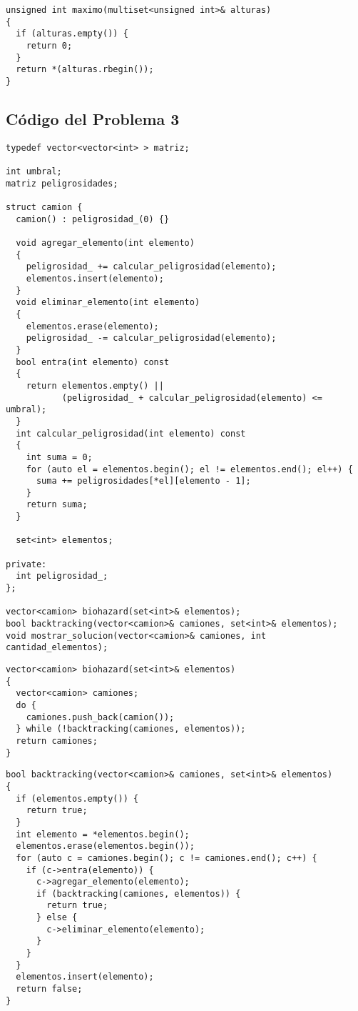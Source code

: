 \documentclass[a4paper]{article}
\begin{document}
\vspace*{0.5cm}

\begin{lstlisting}
unsigned int maximo(multiset<unsigned int>& alturas)
{
  if (alturas.empty()) {
    return 0;
  }
  return *(alturas.rbegin());
}
\end{lstlisting}

\newpage

\subsection{Código del Problema 3}



\vspace*{0.5cm}

\begin{lstlisting}
typedef vector<vector<int> > matriz;

int umbral;
matriz peligrosidades;

struct camion {
  camion() : peligrosidad_(0) {}

  void agregar_elemento(int elemento)
  {
    peligrosidad_ += calcular_peligrosidad(elemento);
    elementos.insert(elemento);
  }
  void eliminar_elemento(int elemento)
  {
    elementos.erase(elemento);
    peligrosidad_ -= calcular_peligrosidad(elemento);
  }
  bool entra(int elemento) const
  {
    return elementos.empty() ||
           (peligrosidad_ + calcular_peligrosidad(elemento) <= umbral);
  }
  int calcular_peligrosidad(int elemento) const
  {
    int suma = 0;
    for (auto el = elementos.begin(); el != elementos.end(); el++) {
      suma += peligrosidades[*el][elemento - 1];
    }
    return suma;
  }

  set<int> elementos;

private:
  int peligrosidad_;
};

vector<camion> biohazard(set<int>& elementos);
bool backtracking(vector<camion>& camiones, set<int>& elementos);
void mostrar_solucion(vector<camion>& camiones, int cantidad_elementos);
\end{lstlisting}

\vspace*{0.5cm}

\begin{lstlisting}
vector<camion> biohazard(set<int>& elementos)
{
  vector<camion> camiones;
  do {
    camiones.push_back(camion());
  } while (!backtracking(camiones, elementos));
  return camiones;
}
\end{lstlisting}

\newpage

\begin{lstlisting}
bool backtracking(vector<camion>& camiones, set<int>& elementos)
{
  if (elementos.empty()) {
    return true;
  }
  int elemento = *elementos.begin();
  elementos.erase(elementos.begin());
  for (auto c = camiones.begin(); c != camiones.end(); c++) {
    if (c->entra(elemento)) {
      c->agregar_elemento(elemento);
      if (backtracking(camiones, elementos)) {
        return true;
      } else {
        c->eliminar_elemento(elemento);
      }
    }
  }
  elementos.insert(elemento);
  return false;
}
\end{lstlisting}
\end{document}
